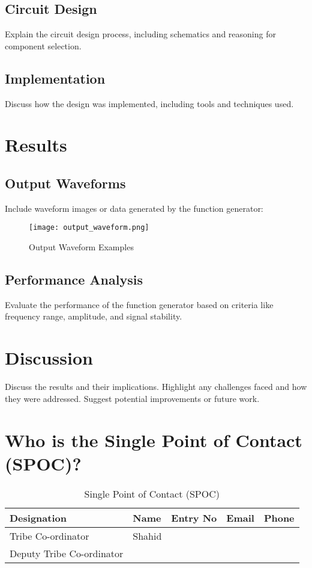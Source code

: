 \documentclass[a4paper,12pt]{article}
\begin{document}
\subsection{Circuit Design}
Explain the circuit design process, including schematics and reasoning for component selection.

\subsection{Implementation}
Discuss how the design was implemented, including tools and techniques used.

\section{Results}
\subsection{Output Waveforms}
Include waveform images or data generated by the function generator:
\begin{figure}[H]
    \centering
    \texttt{[image: output\_waveform.png]} %
    \caption{Output Waveform Examples}
    \label{fig:output_waveform}
\end{figure}

\subsection{Performance Analysis}
Evaluate the performance of the function generator based on criteria like frequency range, amplitude, and signal stability.

\section{Discussion}
Discuss the results and their implications. Highlight any challenges faced and how they were addressed. Suggest potential improvements or future work.



\section{Who is the Single Point of Contact (SPOC)?}
\begin{table}[H]
    \centering
    \begin{tabular}{|l|l|l|l|l|}
        \hline
        \textbf{Designation} & \textbf{Name} & \textbf{Entry No} & \textbf{Email} & \textbf{Phone} \\
        \hline
        Tribe Co-ordinator & Shahid  & & & \\
        \hline
        Deputy Tribe Co-ordinator &  & & & \\
        \hline
    \end{tabular}
    \caption{Single Point of Contact (SPOC)}
\end{table}
\end{document}
